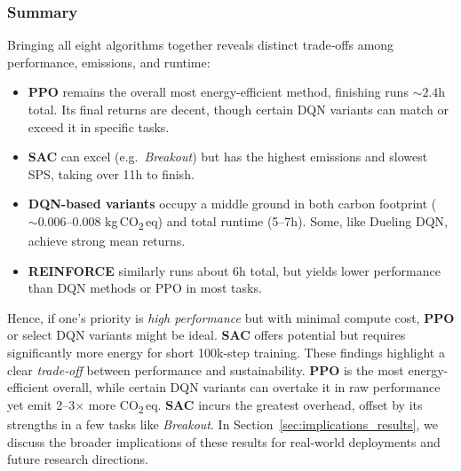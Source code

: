 \subsubsection{Summary}
Bringing all eight algorithms together reveals distinct trade‐offs among performance, 
emissions, and runtime:
\begin{itemize}
	\item \textbf{PPO} remains the overall most energy-efficient method, 
	finishing runs $\sim2.4$h total. Its final returns are decent, though 
	certain DQN variants can match or exceed it in specific tasks.
	\item \textbf{SAC} can excel (e.g.\ \emph{Breakout}) but has the highest 
	emissions and slowest SPS, taking over 11h to finish.
	\item \textbf{DQN-based variants} occupy a middle ground in both carbon 
	footprint ($\sim0.006$--0.008 kg\,CO\textsubscript{2}\,eq) and total runtime (5--7h). 
	Some, like Dueling DQN, achieve strong mean returns.
	\item \textbf{REINFORCE} similarly runs about 6h total, but yields lower 
	performance than DQN methods or PPO in most tasks.
\end{itemize}
Hence, if one's priority is \emph{high performance} but with minimal compute cost, 
\textbf{PPO} or select DQN variants might be ideal. \textbf{SAC} offers potential 
but requires significantly more energy for short 100k-step training. These findings 
highlight a clear \emph{trade‐off} between performance and sustainability. 
\textbf{PPO} is the most energy-efficient overall, while certain DQN variants can 
overtake it in raw performance yet emit 2--3$\times$ more CO\textsubscript{2}\,eq. \textbf{SAC} 
incurs the greatest overhead, offset by its strengths in a few tasks like 
\emph{Breakout}. In Section~\ref{sec:implications_results}, we discuss the broader 
implications of these results for real-world deployments and future research directions.
